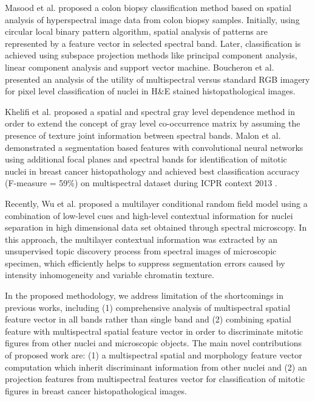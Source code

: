 \documentclass[10pt,twocolumn,letterpaper]{article}
\begin{document}
Masood et al. \cite{masood2009} proposed a colon biopsy classification method based on spatial analysis of hyperspectral image data from colon biopsy samples. Initially, using circular local binary pattern algorithm, spatial analysis of patterns are represented by a feature vector in selected spectral band. Later, classification is achieved using subspace projection methods like principal component analysis, linear component analysis and support vector machine. Boucheron et al. \cite{boucheron2007} presented an analysis of the utility of multispectral versus standard RGB imagery for pixel level classification of nuclei in H\&E stained histopathological images. 

Khelifi et al. \cite{khelifi2012} proposed a spatial and spectral gray level dependence method in order to extend the concept of gray level co-occurrence matrix by assuming the presence of texture joint information between spectral bands. Malon et al. \cite{malon2013} demonstrated a segmentation based features with convolutional neural networks using additional focal planes and spectral bands for identification of mitotic nuclei in breast cancer histopathology and achieved best classification accuracy (F-measure = 59\%) on multispectral dataset during ICPR context 2013 \cite{roux2013}.

Recently, Wu et al. \cite{wu2012} proposed a multilayer conditional random field model using a combination of low-level cues and high-level contextual information for nuclei separation in high dimensional data set obtained through spectral microscopy. In this approach, the multilayer contextual information was extracted by an unsupervised topic discovery process from spectral images of microscopic specimen, which efficiently helps to suppress segmentation errors caused by intensity inhomogeneity and variable chromatin texture.

In the proposed methodology, we address limitation of the shortcomings in previous works, including (1) comprehensive analysis of multispectral spatial feature vector in all bands rather than single band \cite{masood2009,wu2009,wu2012} and (2) combining spatial feature with multispectral spatial feature vector in order to discriminate mitotic figures from other nuclei and microscopic objects. The main novel contributions of proposed work are: (1) a multispectral spatial and morphology feature vector computation which inherit discriminant information from other nuclei and (2) an projection features from multispectral features vector for classification of mitotic figures in breast cancer histopathological images.
\end{document}

